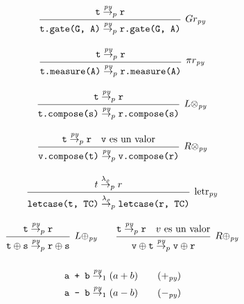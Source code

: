 \begin{definicion}
\[\begin{array}{cc}
   \end{array}
 \]
 \[\arraycolsep=10pt\def\arraystretch{2.6}
   \begin{array}{c}
         \infer[Gr_\textit{py}]
         {\texttt{t.gate(G, A)} \redpy_p \texttt{r.gate(G, A)}}
         {\texttt{t} \redpy_p \texttt{r}}
   \end{array}
 \]
 \[\arraycolsep=10pt\def\arraystretch{2.6}
   \begin{array}{c}
         \infer[\pi r_\textit{py}]
         {\texttt{t.measure(A)} \redpy_p \texttt{r.measure(A)}}
         {\texttt{t} \redpy_p \texttt{r}}
   \end{array} 
 \]
 \[\arraycolsep=10pt\def\arraystretch{2.6}
   \begin{array}{c}
         \infer[L\otimes_\textit{py}]
         {\texttt{t.compose(s)} \redpy_p \texttt{r.compose(s)}}
         {\texttt{t} \redpy_p \texttt{r}}
   \end{array} 
 \]
 \[\arraycolsep=10pt\def\arraystretch{2.6}
   \begin{array}{c}
         \infer[R\otimes_\textit{py}]
         {\texttt{v.compose(t)} \redpy_p \texttt{v.compose(r)}}
         {\texttt{t} \redpy_p \texttt{r} \quad \texttt{v}\text{ es un valor}}
   \end{array}
 \]
 \[\arraycolsep=10pt\def\arraystretch{2.6}
   \begin{array}{c}
     \infer[\text{letr}_\textit{py}]
     {\texttt{letcase(t, TC)} \redlam_p \texttt{letcase(r, TC)}}
     {t \redlam_p r}
   \end{array}
 \]
 \[\arraycolsep=10pt\def\arraystretch{2.6}
   \begin{array}{cc}
     \infer[L\oplus_\textit{py}]
     {\texttt{t}\oplus \texttt{s} \redpy_p \texttt{r} \oplus \texttt{s}}
     {\texttt{t} \redpy_p \texttt{r}}
     &
     \infer[R\oplus_\textit{py}]
     {\texttt{v} \oplus \texttt{t} \redpy_p \texttt{v} \oplus \texttt{r}}
     {\texttt{t} \redpy_p \texttt{r} \quad v\text{ es un valor}}
   \end{array}
 \]
 \vspace{-2\baselineskip}
 \begin{multicols}{2}\noindent
 \begin{align}
     \texttt{a + b} &\redpy_1 (a+b) \tag{$+_\textit{py}$}\\
     \texttt{a - b} &\redpy_1 (a-b) \tag{$-_\textit{py}$}\\

\end{align}
\end{multicols}
\end{definicion}
